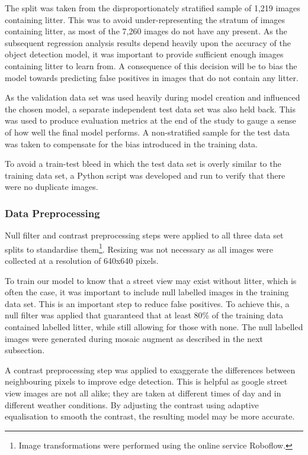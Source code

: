\documentclass{thesis}
\begin{document}
The split was taken from the disproportionately stratified sample of 1,219 images containing litter. This was to avoid under-representing the stratum of images containing litter, as most of the 7,260 images do not have any present. As the subsequent regression analysis results depend heavily upon the accuracy of the object detection model, it was important to provide sufficient enough images containing litter to learn from. A consequence of this decision will be to bias the model towards predicting false positives in images that do not contain any litter.

As the validation data set was used heavily during model creation and influenced the chosen model, a separate independent test data set was also held back. This was used to produce evaluation metrics at the end of the study to gauge a sense of how well the final model performs. A non-stratified sample for the test data was taken to compensate for the bias introduced in the training data.

To avoid a train-test bleed in which the test data set is overly similar to the training data set, a Python script was developed and run to verify that there were no duplicate images.

\subsubsection{Data Preprocessing}

Null filter and contrast preprocessing steps were applied to all three data set splits to standardise them\footnote{Image transformations were performed using the online service Roboflow.}. Resizing was not necessary as all images were collected at a resolution of 640x640 pixels. 

To train our model to know that a street view may exist without litter, which is often the case, it was important to include null labelled images in the training data set. This is an important step to reduce false positives. To achieve this, a null filter was applied that guaranteed that at least 80\% of the training data contained labelled litter, while still allowing for those with none. The null labelled images were generated during mosaic augment as described in the next subsection.

A contrast preprocessing step was applied to exaggerate the differences between neighbouring pixels to improve edge detection\cite{roboflow-contrast}. This is helpful as google street view images are not all alike; they are taken at different times of day and in different weather conditions. By adjusting the contrast using adaptive equalisation to smooth the contrast, the resulting model may be more accurate.
\end{document}
